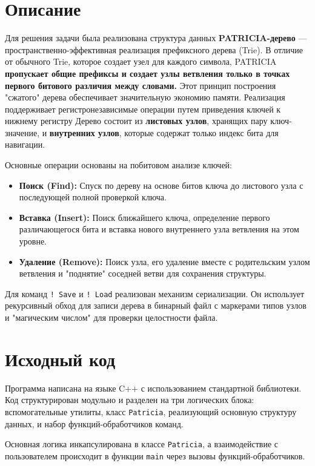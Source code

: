 \section{Описание}

Для решения задачи была реализована структура данных \textbf{PATRICIA-дерево} — пространственно-эффективная реализация префиксного дерева (Trie). В отличие от обычного Trie, которое создает узел для каждого символа, PATRICIA \textbf{пропускает общие префиксы и создает узлы ветвления только в точках первого битового различия между словами.} Этот принцип построения "сжатого" дерева обеспечивает значительную экономию памяти. Реализация поддерживает регистронезависимые операции путем приведения ключей к нижнему регистру
Дерево состоит из \textbf{листовых узлов}, хранящих пару ключ-значение, и \textbf{внутренних узлов}, которые содержат только индекс бита для навигации.

Основные операции основаны на побитовом анализе ключей:
\begin{itemize}
    \item \textbf{Поиск (Find):} Спуск по дереву на основе битов ключа до листового узла с последующей полной проверкой ключа.
    \item \textbf{Вставка (Insert):} Поиск ближайшего ключа, определение первого различающегося бита и вставка нового внутреннего узла ветвления на этом уровне.
    \item \textbf{Удаление (Remove):} Поиск узла, его удаление вместе с родительским узлом ветвления и "поднятие" соседней ветви для сохранения структуры.
\end{itemize}

Для команд \texttt{! Save} и \texttt{! Load} реализован механизм сериализации. Он использует рекурсивный обход для записи дерева в бинарный файл с маркерами типов узлов и "магическим числом" для проверки целостности файла.
\pagebreak

\section{Исходный код}
Программа написана на языке C++ с использованием стандартной библиотеки. Код структурирован модульно и разделен на три логических блока: вспомогательные утилиты, класс \texttt{Patricia}, реализующий основную структуру данных, и набор функций-обработчиков команд.

Основная логика инкапсулирована в классе \texttt{Patricia}, а взаимодействие с пользователем происходит в функции \texttt{main} через вызовы функций-обработчиков.

